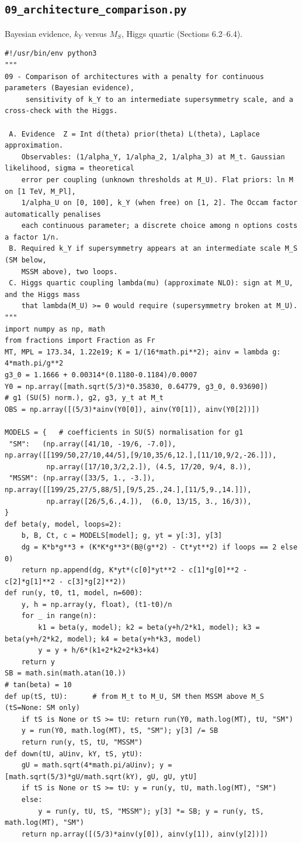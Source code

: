 \documentclass[11pt,a4paper]{article}
\begin{document}
\subsection{\texttt{09\_architecture\_comparison.py}}
Bayesian evidence, $k_Y$ versus $M_S$, Higgs quartic (Sections 6.2--6.4).
\begin{lstlisting}
#!/usr/bin/env python3
"""
09 - Comparison of architectures with a penalty for continuous parameters (Bayesian evidence),
     sensitivity of k_Y to an intermediate supersymmetry scale, and a cross-check with the Higgs.

 A. Evidence  Z = Int d(theta) prior(theta) L(theta), Laplace approximation.
    Observables: (1/alpha_Y, 1/alpha_2, 1/alpha_3) at M_t. Gaussian likelihood, sigma = theoretical
    error per coupling (unknown thresholds at M_U). Flat priors: ln M on [1 TeV, M_Pl],
    1/alpha_U on [0, 100], k_Y (when free) on [1, 2]. The Occam factor automatically penalises
    each continuous parameter; a discrete choice among n options costs a factor 1/n.
 B. Required k_Y if supersymmetry appears at an intermediate scale M_S (SM below,
    MSSM above), two loops.
 C. Higgs quartic coupling lambda(mu) (approximate NLO): sign at M_U, and the Higgs mass
    that lambda(M_U) >= 0 would require (supersymmetry broken at M_U).
"""
import numpy as np, math
from fractions import Fraction as Fr
MT, MPL = 173.34, 1.22e19; K = 1/(16*math.pi**2); ainv = lambda g: 4*math.pi/g**2
g3_0 = 1.1666 + 0.00314*(0.1180-0.1184)/0.0007
Y0 = np.array([math.sqrt(5/3)*0.35830, 0.64779, g3_0, 0.93690])          # g1 (SU(5) norm.), g2, g3, y_t at M_t
OBS = np.array([(5/3)*ainv(Y0[0]), ainv(Y0[1]), ainv(Y0[2])])

MODELS = {   # coefficients in SU(5) normalisation for g1
 "SM":   (np.array([41/10, -19/6, -7.0]), np.array([[199/50,27/10,44/5],[9/10,35/6,12.],[11/10,9/2,-26.]]),
          np.array([17/10,3/2,2.]), (4.5, 17/20, 9/4, 8.)),
 "MSSM": (np.array([33/5, 1., -3.]),      np.array([[199/25,27/5,88/5],[9/5,25.,24.],[11/5,9.,14.]]),
          np.array([26/5,6.,4.]),  (6.0, 13/15, 3., 16/3)),
}
def beta(y, model, loops=2):
    b, B, Ct, c = MODELS[model]; g, yt = y[:3], y[3]
    dg = K*b*g**3 + (K*K*g**3*(B@(g**2) - Ct*yt**2) if loops == 2 else 0)
    return np.append(dg, K*yt*(c[0]*yt**2 - c[1]*g[0]**2 - c[2]*g[1]**2 - c[3]*g[2]**2))
def run(y, t0, t1, model, n=600):
    y, h = np.array(y, float), (t1-t0)/n
    for _ in range(n):
        k1 = beta(y, model); k2 = beta(y+h/2*k1, model); k3 = beta(y+h/2*k2, model); k4 = beta(y+h*k3, model)
        y = y + h/6*(k1+2*k2+2*k3+k4)
    return y
SB = math.sin(math.atan(10.))                                             # tan(beta) = 10
def up(tS, tU):      # from M_t to M_U, SM then MSSM above M_S (tS=None: SM only)
    if tS is None or tS >= tU: return run(Y0, math.log(MT), tU, "SM")
    y = run(Y0, math.log(MT), tS, "SM"); y[3] /= SB
    return run(y, tS, tU, "MSSM")
def down(tU, aUinv, kY, tS, ytU):
    gU = math.sqrt(4*math.pi/aUinv); y = [math.sqrt(5/3)*gU/math.sqrt(kY), gU, gU, ytU]
    if tS is None or tS >= tU: y = run(y, tU, math.log(MT), "SM")
    else:
        y = run(y, tU, tS, "MSSM"); y[3] *= SB; y = run(y, tS, math.log(MT), "SM")
    return np.array([(5/3)*ainv(y[0]), ainv(y[1]), ainv(y[2])])


\end{lstlisting}
\end{document}
